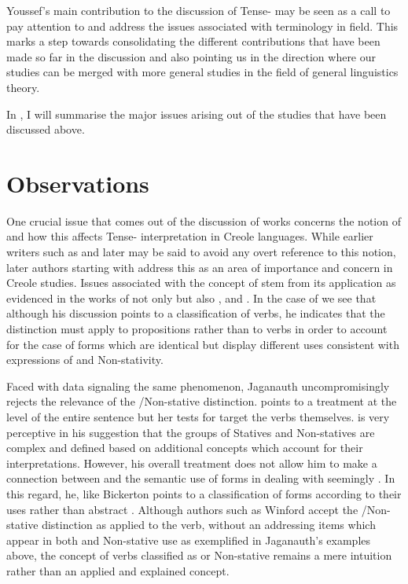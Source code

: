 Youssef’s main contribution to the discussion of Tense- may be
seen as a call to pay attention to and address the issues associated
with terminology in field.  This marks a step towards consolidating
the different contributions that have been made so far in the
discussion and also pointing us in the direction where our studies can
be merged with more general studies in the field of general
linguistics theory.

In , I will summarise the major issues arising out of
the studies that have been discussed above.


\section{Observations}\label{sec:2.2}

One crucial issue that comes out of the discussion of works concerns
the notion of  and how this affects Tense-
interpretation in Creole languages.  While earlier writers such as
\citet{Voorhoeve1957} and later \citet{Alleyne1980} may be said to
avoid any overt reference to this notion, later authors starting with
\citet{Bickerton1975} address this as an area of importance and
concern in Creole studies.  Issues associated with the concept of
 stem from its application as evidenced in the works of not
only \citet{Bickerton1975} but also \citet{Jaganauth1987},
\citet{Gooden2008} and \citet{Sidnell2002}.  In the case of
\citet{Bickerton1975} we see that although his discussion points to a
classification of verbs, he indicates that the distinction must apply
to propositions rather than to verbs in order to account for the case
of forms which are identical but display different uses consistent
with expressions of  and Non-stativity.

Faced with data signaling the same phenomenon, Jaganauth
uncompromisingly rejects the relevance of the \slash Non-stative
distinction.  \citet{Gooden2008} points to a treatment at the level of
the entire sentence but her tests for  target the verbs
themselves.  \citet{Sidnell2002} is very perceptive in his suggestion
that the groups of Statives and Non-statives are complex and defined
based on additional concepts which account for their interpretations.
However, his overall treatment does not allow him to make a connection
between  and the semantic use of forms in dealing
with seemingly .  In this regard, he, like
Bickerton points to a classification of forms according to their uses
rather than abstract .  Although authors such as
Winford accept the \slash Non-stative distinction as applied to the
verb, without an addressing items which appear in both  and
Non-stative use as exemplified in Jaganauth’s examples above, the
concept of verbs classified as  or Non-stative remains a mere
intuition rather than an applied and explained concept.

